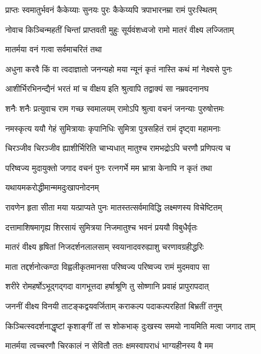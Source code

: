 \twolineshloka
{प्राप्तः स्वमातुर्भवनं कैकेय्याः सुनयः पुरः}
{कैकेय्यपि त्रपाभारनम्रा रामं पुरःस्थितम्}%

\twolineshloka
{नोवाच किञ्चिन्महतीं चिन्तां प्राप्तवती मुहुः}
{सूर्यवंशध्वजो रामो मातरं वीक्ष्य लज्जिताम्}%



\onelineshloka
{मातर्मया वनं गत्वा सर्वमाचरितं तथा}%

\twolineshloka
{अधुना करवै किं वा त्वदाज्ञातो जनन्यहो}
{मया न्यूनं कृतं नास्ति कथं मां नेक्ष्यसे पुनः}%

\twolineshloka
{आशीर्भिरभिनन्द्यैनं भरतं मां च वीक्षय}
{इति श्रुत्वापि तद्वाक्यं सा नम्रवदनानघ}%

\twolineshloka
{शनैः शनैः प्रत्युवाच राम गच्छ स्वमालयम्}
{रामोऽपि श्रुत्वा वचनं जनन्याः पुरुषोत्तमः}%

\twolineshloka
{नमस्कृत्य ययौ गेहं सुमित्रायाः कृपानिधिः}
{सुमित्रा पुत्रसहितं रामं दृष्ट्वा महामनाः}%

\twolineshloka
{चिरञ्जीव चिरञ्जीव ह्याशीर्भिरिति चाभ्यधात्}
{मातुश्च रामभद्रोऽपि चरणौ प्रणिपत्य च}%

\twolineshloka
{परिष्वज्य मुदायुक्तो जगाद वचनं पुनः}
{रत्नगर्भे मम भ्रात्रा केनापि न कृतं तथा}%

\onelineshloka
{यथायमकरोद्धीमान्ममदुःखापनोदनम्}%

\twolineshloka
{रावणेन हृता सीता मया यत्प्राप्यते पुनः}
{मातस्तत्सर्वमाविद्धि लक्ष्मणस्य विचेष्टितम्}%

\twolineshloka
{दत्तामाशिषमागृह्य शिरसायं सुमित्रया}
{निजमातुश्च भवनं प्रययौ विबुधैर्वृतः}%

\twolineshloka
{मातरं वीक्ष्य हृषितां निजदर्शनलालसाम्}
{स्वयानादवरुह्याशु चरणावग्रहीद्धरिः}%

\twolineshloka
{माता तद्दर्शनोत्कण्ठा विह्वलीकृतमानसा}
{परिष्वज्य परिष्वज्य रामं मुदमवाप सा}%

\twolineshloka
{शरीरे रोमहर्षोऽभूद्गद्गदा वागभूत्तदा}
{हर्षाश्रूणि तु सोष्णानि प्रवाहं प्रापुरापदात्}%

\twolineshloka
{जननीं वीक्ष्य विनयी ताटङ्कद्वयवर्जिताम्}
{कराकल्प पदाकल्परहितां बिभ्रतीं तनुम्}%

\twolineshloka
{किञ्चित्स्वदर्शनाद्धृष्टां कृशाङ्गीं तां स शोकभाक्}
{दुःखस्य समयो नायमिति मत्वा जगाद ताम्}%


\twolineshloka
{मातर्मया त्वच्चरणौ चिरकालं न सेवितौ}
{ततः क्षमस्वापराधं भाग्यहीनस्य वै मम}%

